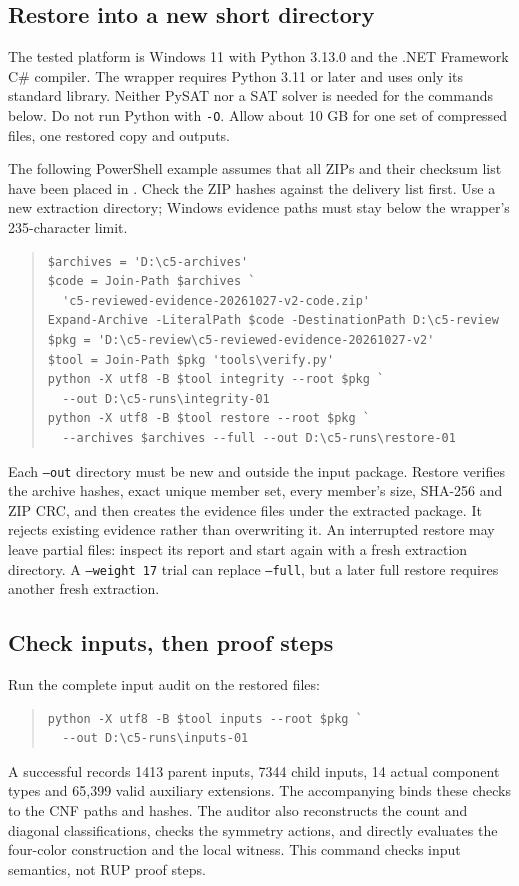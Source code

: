 \subsection{Restore into a new short directory}
The tested platform is Windows 11 with Python 3.13.0 and the .NET
Framework C\# compiler. The wrapper requires Python 3.11 or later and
uses only its standard library. Neither PySAT nor a SAT solver is needed
for the commands below. Do not run Python with \texttt{-O}. Allow about
10 GB for one set of compressed files, one restored copy and outputs.

The following PowerShell example assumes that all ZIPs and their
checksum list have been placed in . Check the ZIP
hashes against the delivery list first. Use a new extraction directory;
Windows evidence paths must stay below the wrapper's 235-character limit.
\begin{quote}\small
\begin{verbatim}
$archives = 'D:\c5-archives'
$code = Join-Path $archives `
  'c5-reviewed-evidence-20261027-v2-code.zip'
Expand-Archive -LiteralPath $code -DestinationPath D:\c5-review
$pkg = 'D:\c5-review\c5-reviewed-evidence-20261027-v2'
$tool = Join-Path $pkg 'tools\verify.py'
python -X utf8 -B $tool integrity --root $pkg `
  --out D:\c5-runs\integrity-01
python -X utf8 -B $tool restore --root $pkg `
  --archives $archives --full --out D:\c5-runs\restore-01
\end{verbatim}
\end{quote}
Each \texttt{--out} directory must be new and outside the input package.
Restore verifies the archive hashes, exact unique member set, every
member's size, SHA-256 and ZIP CRC, and then creates the evidence files
under the extracted package. It rejects existing evidence rather than
overwriting it. An interrupted restore may leave partial files: inspect
its report and start again with a fresh extraction directory. A
\texttt{--weight 17} trial can replace \texttt{--full}, but a later full
restore requires another fresh extraction.

\subsection{Check inputs, then proof steps}
Run the complete input audit on the restored files:
\begin{quote}\small
\begin{verbatim}
python -X utf8 -B $tool inputs --root $pkg `
  --out D:\c5-runs\inputs-01
\end{verbatim}
\end{quote}
A successful  records 1413 parent inputs, 7344 child
inputs, 14 actual component types and 65,399 valid auxiliary extensions.
The accompanying  binds these checks to the CNF
paths and hashes. The auditor also reconstructs the count and diagonal
classifications, checks the symmetry actions, and directly evaluates the
four-color construction and the local witness. This command checks input
semantics, not RUP proof steps.

